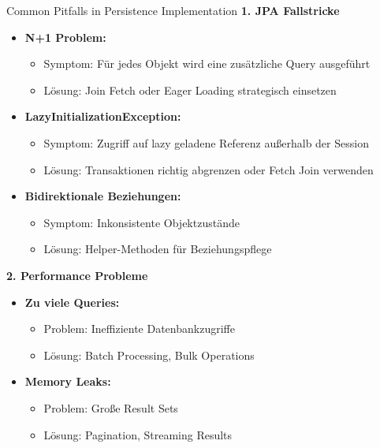 \begin{KR}{Common Pitfalls in Persistence Implementation}
\textbf{1. JPA Fallstricke}
\begin{itemize}
    \item \textbf{N+1 Problem:}
    \begin{itemize}
        \item Symptom: Für jedes Objekt wird eine zusätzliche Query ausgeführt
        \item Lösung: Join Fetch oder Eager Loading strategisch einsetzen
    \end{itemize}
    \item \textbf{LazyInitializationException:}
    \begin{itemize}
        \item Symptom: Zugriff auf lazy geladene Referenz außerhalb der Session
        \item Lösung: Transaktionen richtig abgrenzen oder Fetch Join verwenden
    \end{itemize}
    \item \textbf{Bidirektionale Beziehungen:}
    \begin{itemize}
        \item Symptom: Inkonsistente Objektzustände
        \item Lösung: Helper-Methoden für Beziehungspflege
    \end{itemize}
\end{itemize}

\textbf{2. Performance Probleme}
\begin{itemize}
    \item \textbf{Zu viele Queries:}
    \begin{itemize}
        \item Problem: Ineffiziente Datenbankzugriffe
        \item Lösung: Batch Processing, Bulk Operations
    \end{itemize}
    \item \textbf{Memory Leaks:}
    \begin{itemize}
        \item Problem: Große Result Sets
        \item Lösung: Pagination, Streaming Results
    \end{itemize}
\end{itemize}
\end{KR}


